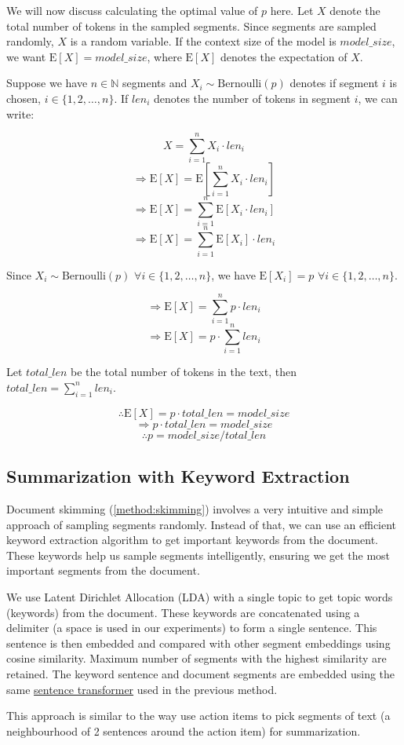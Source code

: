 		We will now discuss calculating the optimal value of $p$ here.
		Let $X$ denote the total number of tokens in the sampled segments.
		Since segments are sampled randomly, $X$ is a random variable.
		If the context size of the model is $model\_size$, we want $\mathrm{E}[X] = model\_size$,
		where $\mathrm{E}[X]$ denotes the expectation of $X$.

		Suppose we have $n \in \mathbb{N}$ segments and $X_i \sim \mathrm{Bernoulli}(p)$ denotes
		if segment $i$ is chosen, $i \in \{1, 2, \dots, n\}$.
		If $len_i$ denotes the number of tokens in segment $i$, we can write:

		\[ X = \sum_{i = 1}^{n} X_i \cdot len_i \]
		\[ \Rightarrow \mathrm{E}[X] = \mathrm{E}[\sum_{i = 1}^{n} X_i \cdot len_i] \]
		\[ \Rightarrow \mathrm{E}[X] = \sum_{i = 1}^{n} \mathrm{E}[X_i \cdot len_i] \]
		\[ \Rightarrow \mathrm{E}[X] = \sum_{i = 1}^{n} \mathrm{E}[X_i] \cdot len_i \]

		Since $X_i \sim \mathrm{Bernoulli}(p)$ $\forall i \in \{1, 2, \dots, n\}$, we
		have $\mathrm{E}[X_i] = p$ $\forall i \in \{1, 2, \dots, n\}$.

		\[ \Rightarrow \mathrm{E}[X] = \sum_{i = 1}^{n} p \cdot len_i \]
		\[ \Rightarrow \mathrm{E}[X] = p \cdot \sum_{i = 1}^{n} len_i \]

		Let $total\_len$ be the total number of tokens in the text, then
		$total\_len = \sum_{i = 1}^{n} len_i$.

		\[ \therefore \mathrm{E}[X] = p \cdot total\_len = model\_size \]
		\[ \Rightarrow p \cdot total\_len = model\_size \]
		\[ \therefore p = model\_size / total\_len \]


	\subsection{Summarization with Keyword Extraction}
		\label{method:keyword}

		Document skimming (\ref{method:skimming}) involves a very intuitive and simple approach of
		sampling segments randomly.
		Instead of that, we can use an efficient keyword extraction algorithm to get important keywords
		from the document.
		These keywords help us sample segments intelligently, ensuring we get the most important
		segments from the document.

		We use Latent Dirichlet Allocation (LDA) \cite{blei2003latent} with a single topic to get topic
		words (keywords) from the document.
		These keywords are concatenated using a delimiter (a space is used in our experiments) to form a
		single sentence.
		This sentence is then embedded and compared with other segment embeddings using cosine similarity.
		Maximum number of segments with the highest similarity are retained.
		The keyword sentence and document segments are embedded using the same
		\href{https://huggingface.co/sentence-transformers/all-MiniLM-L6-v2}{sentence transformer}
		used in the previous method.

		This approach is similar to the way \citet{golia2024action} use action items to pick segments
		of text (a neighbourhood of 2 sentences around the action item) for summarization.
